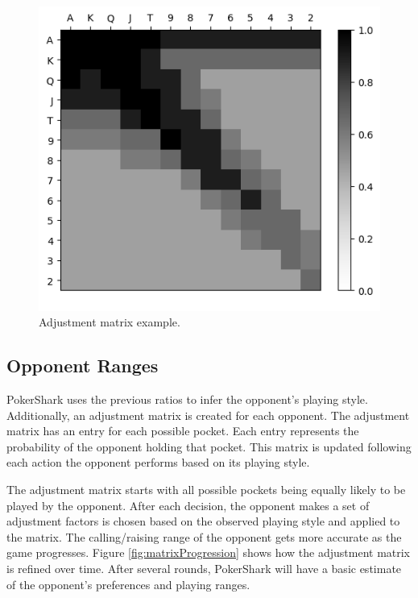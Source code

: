 \begin{figure}[h]
    \centering
    \includegraphics[width=\textwidth/2]{graphics/weights.png}
    \caption{Adjustment matrix example.}
    \label{fig:matrix}
\end{figure}

\subsection{Opponent Ranges}

PokerShark uses the previous ratios to infer the opponent's playing style. Additionally, an adjustment matrix is created for each opponent. The adjustment matrix has an entry for each possible pocket. Each entry represents the probability of the opponent holding that pocket. This matrix is updated following each action the opponent performs based on its playing style.

The adjustment matrix starts with all possible pockets being equally likely to be played by the opponent. After each decision, the opponent makes a set of adjustment factors is chosen based on the observed playing style and applied to the matrix. The calling/raising range of the opponent gets more accurate as the game progresses. Figure \ref{fig:matrixProgression} shows how the adjustment matrix is refined over time. After several rounds, PokerShark will have a basic estimate of the opponent's preferences and playing ranges. 

